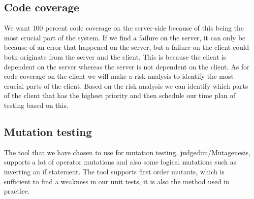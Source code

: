 \documentclass[a4paper,12pt]{memoir}
\begin{document}
\subsection{Code coverage}
We want 100 percent code coverage on the server-side because of this being the most crucial part of the system. If we find a failure on the server, it can only be because of an error that happened on the server, but a failure on the client could both originate from the server and the client. This is because the client is dependent on the server whereas the server is not dependent on the client. As for code coverage on the client we will make a risk analysis to identify the most crucial parts of the client. Based on the risk analysis we can identify which parts of the client that has the highest priority and then schedule our time plan of testing based on this.

\subsection{Mutation testing} %
The tool that we have chosen to use for mutation testing, judgedim/Mutagenesis, supports a lot of operator mutations and also some logical mutations such as inverting an if statement. The tool supports first order mutants, which is sufficient to find a weakness in our unit tests, it is also the method used in practice. 
\end{document}
